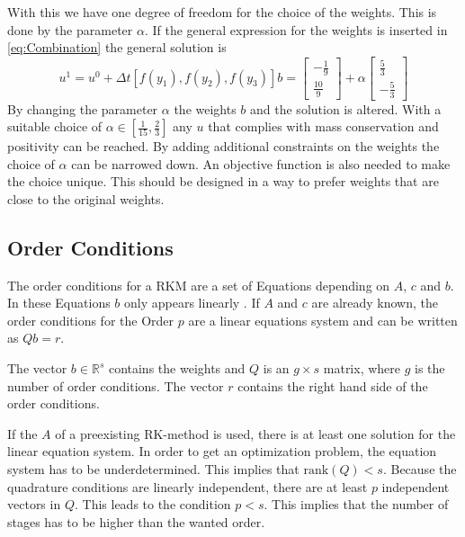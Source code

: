 \documentclass[a4paper]{scrartcl}
\numberwithin{equation}{section}
\theoremstyle{plain}
\theoremstyle{definition}
\numberwithin{theorem}{section}
\newcommand{\R}{\mathbb{R}}
\newcommand{\dt}{{\Delta t}}
\newcommand{\1}{\mathbbm{1}}
\begin{document}
With this we have one degree of freedom for the choice of the weights. This is done by the parameter $\alpha$.
If the general expression for the weights is inserted in \eqref{eq:Combination} the general solution is 
\begin{equation}
u^{1} = u^0 + \dt  \left[f(y_1),f(y_2),f(y_3)\right] b =
\left[\begin{matrix}- \frac{1}{9}\\\frac{10}{9}\end{matrix}\right] +\alpha \left[\begin{matrix}\frac{5}{3}\\- \frac{5}{3}\end{matrix}\right]
\end{equation}
By changing the parameter $\alpha$ the weights $b$ and the solution is altered.
With a suitable choice of $\alpha \in \left[\frac{1}{15},\frac{2}{3}\right]$ any $u$ that complies with mass conservation and positivity can be reached. 
By adding additional constraints on the weights the choice of $\alpha$ can be narrowed down. 
An objective function is also needed to make the choice unique. This should be designed in a way to prefer weights that are close to the original weights.







\subsection{Order Conditions}\label{sec:OrderCond}

The order conditions for a RKM are a set of Equations depending on $A$, $c$ and $b$. In these Equations $b$ only appears linearly \cite{hairer_solving_1993}.
If $A$ and $c$ are already known, the order conditions for the Order $p$ are a linear equations system and can be written as $Q b = r$. 

The vector $b \in \R^s$ contains the weights and $Q$ is an $g \times s$ matrix, where $g$ is the number of order conditions. The vector $r$ contains the right hand side of the order conditions.

If the $A$ of a preexisting RK-method is used, there is at least one solution for the linear equation system.
In order to get an optimization problem, the equation system has to be underdetermined.
This implies that $\mathrm{rank}(Q) < s$. 
Because the quadrature conditions are linearly independent, there are at least $p$ independent vectors in $Q$. This leads to the condition $p < s$.
This implies that the number of stages has to be higher than the wanted order.
\end{document}
